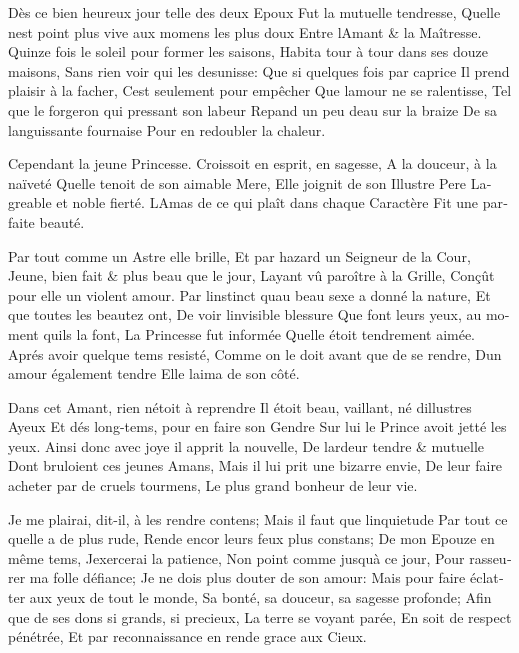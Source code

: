\documentclass[14pt,a4paper]{memoir}
\begin{document}
{{\begin{otherlanguage}{french}
{Dès ce bien heureux jour telle des deux Epoux} {Fut la mutuelle
tendresse,} {Qu\textquotesingle elle n\textquotesingle est point plus
vive aux momens les plus doux} {Entre l\textquotesingle Amant \& la
Maîtresse.} {Quinze fois le soleil pour former les saisons,} {Habita
tour à tour dans ses douze maisons,} {Sans rien voir qui les desunisse:}
{Que si quelques fois par caprice} {Il prend plaisir à la facher,}
{C\textquotesingle est seulement pour empêcher} {Que
l\textquotesingle amour ne se ralentisse,} {Tel que le forgeron qui
pressant son labeur} {Repand un peu d\textquotesingle eau sur la braize}
{De sa languissante fournaise} {Pour en redoubler la chaleur.}

{Cependant la jeune Princesse.} {Croissoit en esprit, en sagesse,} {A la
douceur, à la naïveté} {Qu\textquotesingle elle tenoit de son aimable
Mere,} {Elle joignit de son Illustre Pere} {L\textquotesingle agreable
et noble fierté.} {L\textquotesingle Amas de ce qui plaît dans chaque
Caractère} {Fit une parfaite beauté.}

{Par tout comme un Astre elle brille,} {Et par hazard un Seigneur de la
Cour,} {Jeune, bien fait \& plus beau que le jour,}
{L\textquotesingle ayant vû paroître à la Grille,} {Conçût pour elle un
violent amour.} {Par l\textquotesingle instinct qu\textquotesingle au
beau sexe a donné la nature, } {Et que toutes les beautez ont,} {De voir
l\textquotesingle invisible blessure} {Que font leurs yeux, au moment
qu\textquotesingle ils la font,} {La Princesse fut informée}
{Qu\textquotesingle elle étoit tendrement aimée.} {Aprés avoir quelque
tems resisté,} {Comme on le doit avant que de se rendre,}
{D\textquotesingle un amour également tendre} {Elle
l\textquotesingle aima de son côté.}

{Dans cet Amant, rien n\textquotesingle étoit à reprendre} {Il étoit
beau, vaillant, né d\textquotesingle illustres Ayeux} {Et dés long-tems,
pour en faire son Gendre} {Sur lui le Prince avoit jetté les yeux.}
{Ainsi donc avec joye il apprit la nouvelle,} {De
l\textquotesingle ardeur tendre \& mutuelle} {Dont bruloient ces jeunes
Amans,} {Mais il lui prit une bizarre envie,} {De leur faire acheter par
de cruels tourmens,} {Le plus grand bonheur de leur vie.}

{Je me plairai, dit-il, à les rendre contens;} {Mais il faut que
l\textquotesingle inquietude} {Par tout ce qu\textquotesingle elle a de
plus rude,} {Rende encor leurs feux plus constans;} {De mon Epouze en
même tems,} {J\textquotesingle exercerai la patience,} {Non point comme
jusqu\textquotesingle à ce jour,} {Pour rasseurer ma folle défiance;}
{Je ne dois plus douter de son amour:} {Mais pour faire éclatter aux
yeux de tout le monde,} {Sa bonté, sa douceur, sa sagesse profonde;}
{Afin que de ses dons si grands, si precieux,} {La terre se voyant
parée,} {En soit de respect pénétrée,} {Et par reconnaissance en rende
grace aux Cieux. }


\end{otherlanguage}}}
\end{document}

